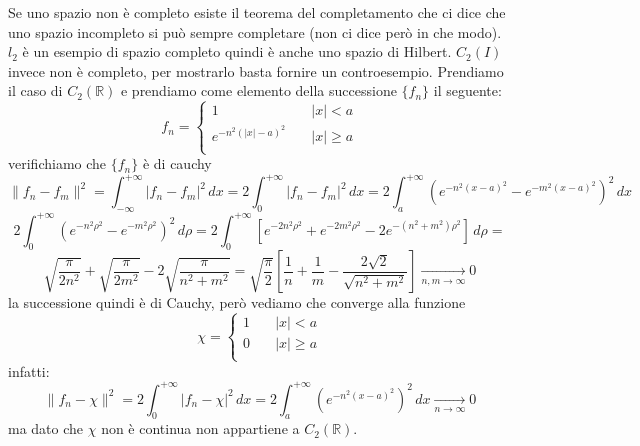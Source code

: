 \documentclass[12pt]{book}
\theoremstyle{plain}
\newcommand{\R}{\mathbb{R}}
\theoremstyle{definition}
\theoremstyle{remark}
\begin{document}
\hspace{-1.6em}Se uno spazio non è completo esiste il teorema del completamento che ci dice che uno spazio incompleto si può sempre completare (non ci dice però in che modo).\\
\newline$l_2$ è un esempio di spazio completo quindi è anche uno spazio di Hilbert. $C_2(I)$ invece non è completo, per mostrarlo basta fornire un controesempio. Prendiamo il caso di $C_2(\R)$ e prendiamo come elemento della successione $\{f_n\}$ il seguente:
\[f_n =  \begin{cases}
    1      & \quad|x|< a\\
    e^{-n^2(|x|-a)^2} & \quad |x|\geq a\\
  \end{cases}
  \]
 verifichiamo che $\{f_n\}$ è di cauchy
 \[\|f_n-f_m\|^2 = \int_{-\infty}^{+\infty}|f_n-f_m|^2\,dx = 2\int_0^{+\infty}|f_n-f_m|^2\,dx = 2\int_a^{+\infty}(e^{-n^2(x-a)^2} - e^{-m^2(x-a)^2})^2\,dx \]
\[2\int_0^{+\infty}(e^{-n^2\rho^2} - e^{-m^2\rho^2})^2\,d\rho = 2\int_0^{+\infty}[ e^{-2n^2\rho^2} + e^{-2m^2\rho^2} - 2e^{-(n^2+m^2)\rho^2}]\,d\rho = \]
\[\sqrt{\frac{\pi}{2n^2}} + \sqrt{\frac{\pi}{2m^2}} - 2\sqrt{\frac{\pi}{n^2+m^2}}=\sqrt{\frac{\pi}{2}}\left[\frac{1}{n}+\frac{1}{m}-\frac{2\sqrt{2}}{\sqrt{n^2+m^2}}\right] \xrightarrow[n,m\to \infty]{}0\]
la successione quindi è di Cauchy, però vediamo che converge alla funzione
\[\chi =  \begin{cases}
    1      & \quad|x|< a\\
    0 & \quad |x|\geq a\\
  \end{cases}\]
infatti:
\[\|f_n-\chi\|^2 = 2\int_0^{+\infty}|f_n-\chi|^2\,dx = 2\int_a^{+\infty}(e^{-n^2(x-a)^2})^2\,dx \xrightarrow[n\to \infty]{}0\]
ma dato che $\chi$ non è continua non appartiene a $C_2(\R)$.
\end{document}
